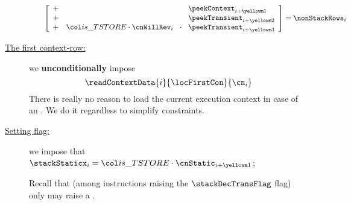 \begin{description}
\begin{enumerate}
				\[
					\left[ \begin{array}{crcl}
						+ &                                    &                   & \peekContext   _{i + \locTransientCurrContextRow } \\
						+ &                                    &                   & \peekTransient _{i + \locTransientDoingRow       } \\
						+ & \locIsTstore \cdot \cnWillRev _{i} & \!\!\!\cdot\!\!\! & \peekTransient _{i + \locTransientUndoingRow     } \\
					\end{array} \right]
					=
					\nonStackRows _{i}
				\]
		\end{enumerate}
	\item[\underline{The first context-row:}]
		we \textbf{unconditionally} impose
		\[
			\readContextData {i}{\locFirstCon}{\cn_{i}}
		\]
		\saNote{}
		There is really no reason to load the current execution context in case of an \oogxSH{}.
		We do it regardless to simplify constraints.
	\item[\underline{Setting \stackStaticx{} flag:}]
		we impose that
		$\stackStaticx_{i} = \locIsTstore \cdot \cnStatic_{i + \locTransientCurrContextRow}$;

		\saNote{}
		Recall that (among instructions raising the $\stackDecTransFlag$ flag) only  may raise a \staticxSH{}.


\end{description}
